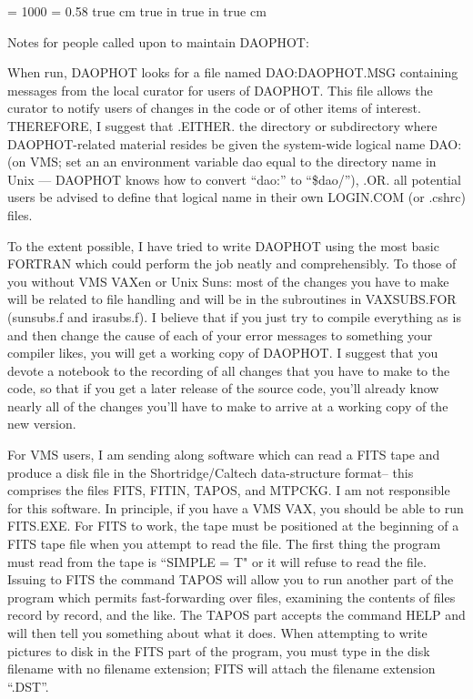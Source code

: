 \def\hi{\noindent \hangindent=20 pt}
\def\etal{{\it et~al.}}
\def\ie{{\it i.e.} }
\def\eg{{\it e.g.}}
\def\cf{{\it cf.}}
\def\ni{\noindent}
\def\Item{\item {$\bullet$}}
\def\kms{~km\thinspace s$^{-1}$}
\def\cl{\centerline}
\def\Mag{${}^{\rm m}$\llap{.}}
\def\Deg{${}^\circ$\llap{.}}
\def\Arcsec{${}^{\prime\prime}$\llap{.}}
\def\today{\number\year\space \ifcase\month\or
  January\or February\or March\or April\or May\or June\or
  July\or August\or September\or October\or November\or December\fi
  \space\number\day}
\magnification = 1000
\baselineskip = 0.58 true cm
 true in
 true in
 true cm
\tenrm
\centerline{Notes for people called upon to maintain DAOPHOT:}
\bigskip
     When run, DAOPHOT looks for a file named DAO:DAOPHOT.MSG containing
messages from the local curator for users of DAOPHOT.  This file allows
the curator to notify users of changes in the code or of other items of
interest.  THEREFORE, I suggest that .EITHER. the directory or
subdirectory where DAOPHOT-related material resides be given the
system-wide logical name DAO: (on VMS; set an an environment variable
dao equal to the directory name in Unix --- DAOPHOT knows how to
convert ``dao:'' to ``\$dao/''), .OR. all potential users be advised to
define that logical name in their own LOGIN.COM (or .cshrc) files.

     To the extent possible, I have tried to write DAOPHOT using the
most basic FORTRAN which could perform the job neatly and
comprehensibly.  To those of you without VMS VAXen or Unix Suns:  most
of the changes you have to make will be related to file handling and
will be in the subroutines in VAXSUBS.FOR (sunsubs.f and irasubs.f). I
believe that if you just try to compile everything as is and then
change the cause of each of your error messages to something your
compiler likes, you will get a working copy of DAOPHOT.  I suggest that
you devote a notebook to the recording of all changes that you have to
make to the code, so that if you get a later release of the source
code, you'll already know nearly all of the changes you'll have to make
to arrive at a working copy of the new version.

     For VMS users, I am sending along software which can read a FITS
tape and produce a disk file in the Shortridge/Caltech data-structure
format--  this comprises the files FITS, FITIN, TAPOS, and MTPCKG.  I
am not responsible for this software.  In principle, if you have a VMS
VAX, you should be able to run FITS.EXE.  For FITS to work, the tape
must be positioned at the beginning of a FITS tape file when you
attempt to read the file.  The first thing the program must read from
the tape is ``SIMPLE = T" or it will refuse to read the file.  Issuing
to FITS the command TAPOS will allow you to run another part of the
program which permits fast-forwarding over files, examining the
contents of files record by record, and the like.  The TAPOS part
accepts the command HELP and will then tell you something about what it
does.  When attempting to write pictures to disk in the FITS part of
the program, you must type in the disk filename with no filename
extension; FITS will attach the filename extension ``.DST''.


